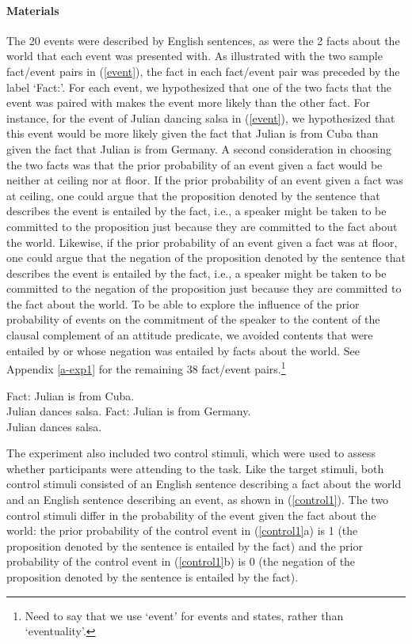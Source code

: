 \documentclass[11pt,fleqn]{article}
\newcommand{\6}{\mbox{$[\hspace*{-.6mm}[$}}
\newcommand{\9}{\mbox{$]\hspace*{-.6mm}]$}}
\begin{document}
\paragraph{Materials} The 20 events were described by English sentences, as were the 2 facts about the world that each event was presented with. As illustrated with the two sample fact/event pairs in (\ref{event}), the fact in each fact/event pair was preceded by the label `Fact:'.  For each event, we hypothesized that one of the two facts that the event was paired with makes the event more likely than the other fact. For instance, for the event of Julian dancing salsa in (\ref{event}), we hypothesized that this event would be more likely given the fact that Julian is from Cuba than given the fact that Julian is from Germany. A second consideration in choosing the two facts was that the prior probability of an event given a fact would be neither at ceiling nor at floor. If the prior probability of an event given a fact was at ceiling, one could argue that the proposition denoted by the sentence that describes the event is entailed by the fact, i.e., a speaker might be taken to be committed to the proposition just because they are committed to the fact about the world. Likewise, if the prior probability of an event given a fact was at floor, one could argue that the negation of the proposition denoted by the sentence that describes the event is entailed by the fact, i.e., a speaker might be taken to be committed to the negation of the proposition just because they are committed to the fact about the world. To be able to explore the influence of the prior probability of events on the commitment of the speaker to the content of the clausal complement of an attitude predicate, we avoided contents that were entailed by or whose negation was entailed by facts about the world. See Appendix \ref{a-exp1} for the remaining 38 fact/event pairs.\footnote{Need to say that we use `event' for events and states, rather than `eventuality'.}

\begin{exe}
\ex\label{event}
\begin{xlist}
\ex Fact: Julian is from Cuba.
\\Julian dances salsa.
\ex Fact: Julian is from Germany.
\\ Julian dances salsa.
\end{xlist}
\end{exe}

The experiment also included two control stimuli, which were used to assess whether participants were attending to the task. Like the target stimuli, both control stimuli consisted of an English sentence describing a fact about the world and an English sentence describing an event, as shown in (\ref{control1}). The two control stimuli differ in the probability of the event given the fact about the world: the prior probability of the control event in (\ref{control1}a) is 1 (the proposition denoted by the sentence is entailed by the fact) and the prior probability of the control event in (\ref{control1}b) is 0 (the negation of the proposition denoted by the sentence is entailed by the fact).
\end{document}
